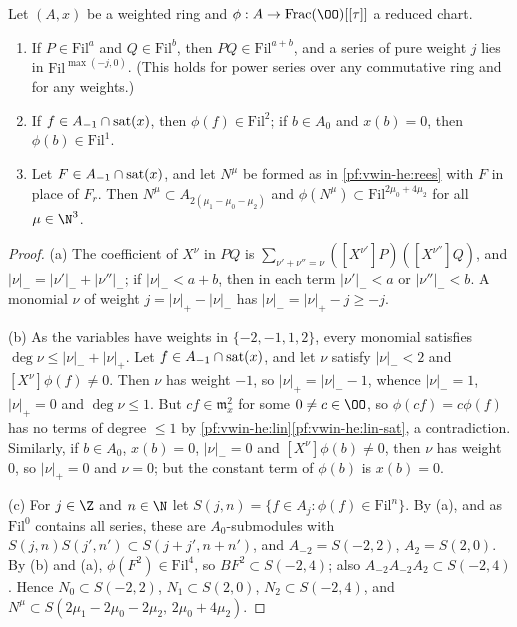 \begin{lemma}\label{pf:vwin-he:filt}
Let $(A,x)$ be a weighted ring and $\phi:A\to\mathrm{Frac}(\OO)[[\tau]]$ a reduced chart.
\begin{enumerate}[label=(\alph*)]
\item\label{pf:vwin-he:filt-mul} If $P\in\mathrm{Fil}^a$ and $Q\in\mathrm{Fil}^b$, then $PQ\in\mathrm{Fil}^{a+b}$, and
a series of pure weight $j$ lies in $\mathrm{Fil}^{\max(-j,0)}$. (This holds for power series over any commutative
ring and for any weights.)
\item\label{pf:vwin-he:filt-sat} If $f\in A_{-1}\cap\operatorname{sat}(x)$, then $\phi(f)\in\mathrm{Fil}^2$; if $b\in A_0$ and
$x(b)=0$, then $\phi(b)\in\mathrm{Fil}^1$.
\item\label{pf:vwin-he:filt-lat} Let $F\in A_{-1}\cap\operatorname{sat}(x)$, and let $N^\mu$ be formed as in
\cref{pf:vwin-he:rees} with $F$ in place of $F_r$. Then $N^\mu\subset A_{2(\mu_1-\mu_0-\mu_2)}$ and
$\phi(N^\mu)\subset\mathrm{Fil}^{2\mu_0+4\mu_2}$ for all $\mu\in\N^3$.
\end{enumerate}
\end{lemma}

\begin{proof}
(a) The coefficient of $X^\nu$ in $PQ$ is $\sum_{\nu'+\nu''=\nu}([X^{\nu'}]P)([X^{\nu''}]Q)$, and
$|\nu|_-=|\nu'|_-+|\nu''|_-$; if $|\nu|_-<a+b$, then in each term $|\nu'|_-<a$ or $|\nu''|_-<b$. A monomial $\nu$ of
weight $j=|\nu|_+-|\nu|_-$ has $|\nu|_-=|\nu|_+-j\ge-j$.

(b) As the variables have weights in $\{-2,-1,1,2\}$, every monomial satisfies $\deg\nu\le|\nu|_-+|\nu|_+$. Let
$f\in A_{-1}\cap\operatorname{sat}(x)$, and let $\nu$ satisfy $|\nu|_-<2$ and $[X^\nu]\phi(f)\ne0$. Then $\nu$ has weight
$-1$, so $|\nu|_+=|\nu|_--1$, whence $|\nu|_-=1$, $|\nu|_+=0$ and $\deg\nu\le1$. But $cf\in\mathfrak m_x^2$ for some
$0\ne c\in\OO$, so $\phi(cf)=c\phi(f)$ has no terms of degree $\le1$ by
\cref{pf:vwin-he:lin}\ref{pf:vwin-he:lin-sat}, a contradiction. Similarly, if $b\in A_0$, $x(b)=0$, $|\nu|_-=0$ and
$[X^\nu]\phi(b)\ne0$, then $\nu$ has weight $0$, so $|\nu|_+=0$ and $\nu=0$; but the constant term of $\phi(b)$ is
$x(b)=0$.

(c) For $j\in\Z$ and $n\in\N$ let $S(j,n)=\{f\in A_j:\phi(f)\in\mathrm{Fil}^n\}$. By (a), and as
$\mathrm{Fil}^0$ contains all series, these are $A_0$-submodules with $S(j,n)S(j',n')\subset S(j+j',n+n')$, and
$A_{-2}=S(-2,2)$, $A_2=S(2,0)$. By (b) and (a), $\phi(F^2)\in\mathrm{Fil}^4$, so $BF^2\subset S(-2,4)$; also
$A_{-2}A_{-2}A_2\subset S(-2,4)$. Hence $N_0\subset S(-2,2)$, $N_1\subset S(2,0)$, $N_2\subset S(-2,4)$, and
$N^\mu\subset S(2\mu_1-2\mu_0-2\mu_2,\,2\mu_0+4\mu_2)$.
\end{proof}

